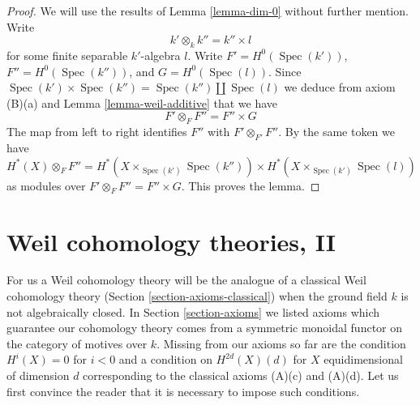 \documentclass{stacks-project}
\theoremstyle{plain}
\theoremstyle{definition}
\theoremstyle{remark}
\numberwithin{equation}{subsection}
\def\Spec{\mathop{\mathrm{Spec}}}
\begin{document}
\begin{proof}
We will use the results of Lemma \ref{lemma-dim-0} without further mention.
Write
$$
k' \otimes_k k'' = k'' \times l
$$
for some finite separable $k'$-algebra $l$. Write
$F' = H^0(\Spec(k'))$, $F'' = H^0(\Spec(k''))$, and $G = H^0(\Spec(l))$.
Since $\Spec(k') \times \Spec(k'') = \Spec(k'') \amalg \Spec(l)$ we
deduce from axiom (B)(a) and Lemma \ref{lemma-weil-additive}
that we have
$$
F' \otimes_F F'' = F'' \times G
$$
The map from left to right identifies $F''$ with $F' \otimes_{F'} F''$.
By the same token we have
$$
H^*(X) \otimes_F F'' = H^*(X \times_{\Spec(k')} \Spec(k''))
\times H^*(X \times_{\Spec(k')} \Spec(l))
$$
as modules over $F' \otimes_F F'' = F'' \times G$. This proves the lemma.
\end{proof}






















\section{Weil cohomology theories, II}
\label{section-old}

\noindent
For us a Weil cohomology theory will be the analogue of a
classical Weil cohomology theory (Section \ref{section-axioms-classical})
when the ground field $k$ is not algebraically closed.
In Section \ref{section-axioms} we listed axioms which guarantee
our cohomology theory comes from a symmetric monoidal functor
on the category of motives over $k$. Missing from our axioms so
far are the condition $H^i(X) = 0$ for $i < 0$ and
a condition on $H^{2d}(X)(d)$ for $X$ equidimensional of dimension $d$
corresponding to the classical axioms (A)(c) and (A)(d).
Let us first convince the reader that it is necessary to impose
such conditions.
\end{document}
